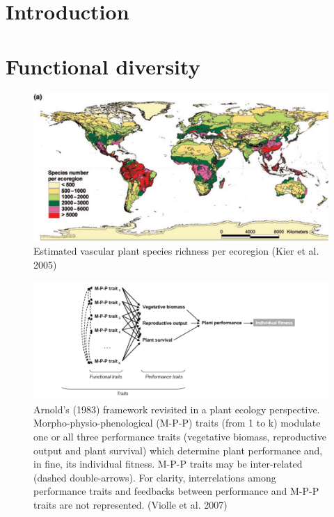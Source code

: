 \documentclass[12pt,oneside]{book}
\begin{document}

\section{Introduction}\label{introduction-3}

\section{Functional diversity}\label{functional-diversity}

\begin{figure}

{\centering \includegraphics[width=0.8\linewidth]{figures/chap7/f71_species_map_Kier} 

}

\caption{Estimated vascular plant species richness per ecoregion (Kier et al. 2005)}\label{fig:f71}
\end{figure}

\begin{figure}

{\centering \includegraphics[width=0.8\linewidth]{figures/chap7/f72_violle} 

}

\caption{Arnold’s (1983) framework revisited in a plant ecology perspective. Morpho-physio-phenological (M-P-P) traits (from 1 to k) modulate one or all three performance traits (vegetative biomass, reproductive output and plant survival) which determine plant performance and, in fine, its individual fitness. M-P-P traits may be inter-related (dashed double-arrows). For clarity, interrelations among performance traits and feedbacks between performance and M-P-P traits are not represented. (Violle et al. 2007)}\label{fig:f72}
\end{figure}
\end{document}
